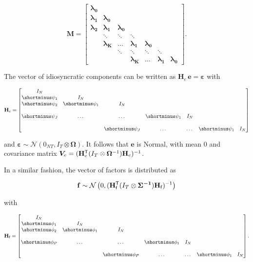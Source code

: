 \documentclass[notitlepage,a4paper,12pt]{article}
\newcommand{\transpose}[1]{{#1}^{\sf{T}}}
\begin{document}
$$
\mathbf{M}
=
\begin{bmatrix}
    \boldsymbol{\lambda_0} &   \\
    \boldsymbol{\lambda_1} & \boldsymbol{\lambda_0}   \\
    \boldsymbol{\lambda_2} & \boldsymbol{\lambda_1} & \boldsymbol{\lambda_0} \\
     & \ddots & \ddots & \ddots \\
     & \boldsymbol{\lambda_K} &\dots & \boldsymbol{\lambda_1} & \boldsymbol{\lambda_0}
     &  \\
     & & \ddots & \ddots & \ddots & \ddots \\
    & & & \boldsymbol{\lambda_K} &\dots & \boldsymbol{\lambda_1} & \boldsymbol{\lambda_0}
\end{bmatrix}.
$$

The vector of idiosyncratic components can be written as $\mathbf{H}_e\, \mathbf{e} = \boldsymbol{\varepsilon}$ with 

$$
\mathbf{H}_e
=
\begin{bmatrix}
    I_N &  \\
    \shortminus \psi_1 & I_N &  \\
    \shortminus \psi_2 & \shortminus \psi_1 & I_N &  \\
     &  &  &  &  & \\
    \shortminus \psi_J & \dots & \dots & \shortminus \psi_1 & I_N \\
     &  &  &  &  & \\
    & & \shortminus \psi_J & \dots & \dots & \shortminus \psi_1 & I_N
\end{bmatrix}
$$

\noindent and $\boldsymbol{\varepsilon} \sim \mathcal{N}(0_{NT}, I_T \otimes \boldsymbol{\Omega})$. It follows that $\mathbf{e}$ is Normal, with mean $0$ and covariance matrix $\bm{V}_{e} = (\transpose{\mathbf{H}}_{e} (I_T \otimes \boldsymbol{\Omega}^{-1}) \mathbf{H}_e)^{-1}$.

In a similar fashion, the vector of factors is distributed as 

$$
\mathbf{f} \sim \mathcal{N}\left(0, (\transpose{\mathbf{H}}_{\sf{f}} (I_T \otimes \boldsymbol{\Sigma^{-1}}) \mathbf{H}_{\sf{f}})^{-1}\right)
$$

with 

$$
\mathbf{H}_{\sf{f}}
=
\begin{bmatrix}
    I_N &  \\
    \shortminus \phi_1 & I_N &  \\
    \shortminus \phi_2 & \shortminus \phi_1 & I_N &  \\
     &  &  &  &  & \\
    \shortminus \phi_P & \dots & \dots & \shortminus \phi_1 & I_N \\
     &  &  &  &  & \\
    & & \shortminus \phi_P & \dots & \dots & \shortminus \phi_1 & I_N
\end{bmatrix}.
$$
\end{document}

